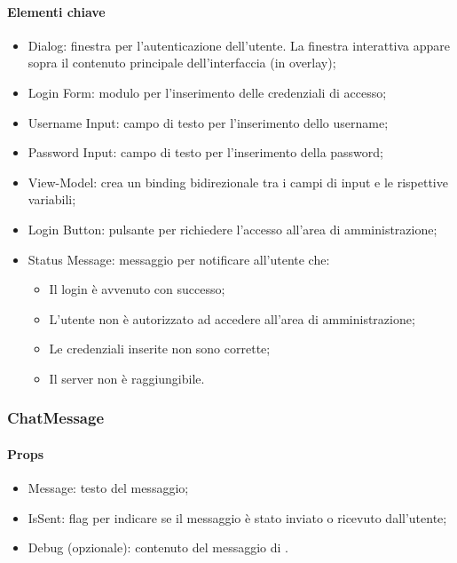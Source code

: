\paragraph*{Elementi chiave}
\begin{itemize}
  \item Dialog: finestra per l'autenticazione dell'utente. La finestra interattiva appare sopra il contenuto principale dell'interfaccia (in overlay);
  \item Login Form: modulo per l'inserimento delle credenziali di accesso;
  \item Username Input: campo di testo per l'inserimento dello username;
  \item Password Input: campo di testo per l'inserimento della password;
  \item View-Model: crea un binding bidirezionale tra i campi di input e le rispettive variabili;
  \item Login Button: pulsante per richiedere l'accesso all'area di amministrazione;
  \item Status Message: messaggio per notificare all'utente che:
  \begin{itemize}
    \item Il login è avvenuto con successo;
    \item L'utente non è autorizzato ad accedere all'area di amministrazione;
    \item Le credenziali inserite non sono corrette;
    \item Il server non è raggiungibile.
  \end{itemize}
\end{itemize}

\subsubsection{ChatMessage}

\paragraph*{Props}
\begin{itemize}
  \item Message: testo del messaggio;
  \item IsSent: flag per indicare se il messaggio è stato inviato o ricevuto dall'utente;
  \item Debug (opzionale): contenuto del messaggio di .
\end{itemize}

